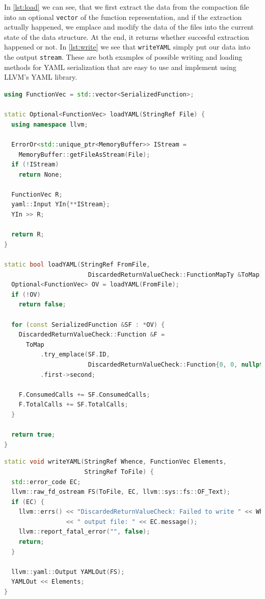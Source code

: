In \cref{lst:load} we can see, that we first extract the data from the compaction file into an optional \lstinline{vector} of the function representation,
and if the extraction actually happened, we emplace and modify the data of the files into the current state of the data structure. At the end, it returns
whether succesful extraction happened or not.
In \cref{lst:write} we see that \texttt{writeYAML} simply put our data into the output \texttt{stream}.
These are both examples of possible writing and loading methods for YAML serialization that are easy to use and implement using LLVM's YAML library.

\begin{lstlisting}[language={C++},caption={Functions for loading.},label={lst:load}]
using FunctionVec = std::vector<SerializedFunction>;

static Optional<FunctionVec> loadYAML(StringRef File) {
  using namespace llvm;
  
  ErrorOr<std::unique_ptr<MemoryBuffer>> IStream =
  	MemoryBuffer::getFileAsStream(File);
  if (!IStream)
    return None;
  
  FunctionVec R;
  yaml::Input YIn{**IStream};
  YIn >> R;
  
  return R;
}
  
static bool loadYAML(StringRef FromFile,
					   DiscardedReturnValueCheck::FunctionMapTy &ToMap) {
  Optional<FunctionVec> OV = loadYAML(FromFile);
  if (!OV)
    return false;
  
  for (const SerializedFunction &SF : *OV) {
    DiscardedReturnValueCheck::Function &F =
      ToMap
    	  .try_emplace(SF.ID,
    				   DiscardedReturnValueCheck::Function{0, 0, nullptr, {}})
    	  .first->second;
    
    F.ConsumedCalls += SF.ConsumedCalls;
    F.TotalCalls += SF.TotalCalls;
  }
  
  return true;
}
\end{lstlisting}

\begin{lstlisting}[language={C++},caption={Function for writing.},label={lst:write}]
static void writeYAML(StringRef Whence, FunctionVec Elements,
                      StringRef ToFile) {
  std::error_code EC;
  llvm::raw_fd_ostream FS(ToFile, EC, llvm::sys::fs::OF_Text);
  if (EC) {
    llvm::errs() << "DiscardedReturnValueCheck: Failed to write " << Whence
                 << " output file: " << EC.message();
    llvm::report_fatal_error("", false);
    return;
  }

  llvm::yaml::Output YAMLOut(FS);
  YAMLOut << Elements;
}
\end{lstlisting}

